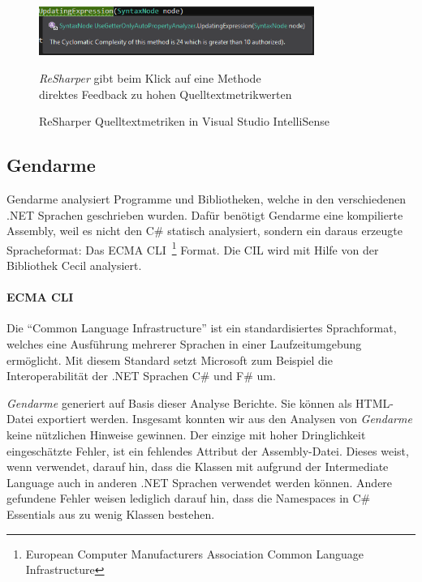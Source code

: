 \begin{figure}[!ht]
	\centering
	\includegraphics[width=0.8\textwidth]{images/rsharper-code-metric-inline.png}
	\caption{ReSharper Quelltextmetriken in Visual Studio IntelliSense}
	\vspace{0.1cm}
	\emph{ReSharper} gibt beim Klick auf eine Methode \\
	direktes Feedback zu hohen Quelltextmetrikwerten 
	\label{fig:rsharper-code-metric-inline}
\end{figure}

\subsection{Gendarme}
\label{sec:gendarme}
Gendarme analysiert Programme und Bibliotheken, welche in den verschiedenen .NET Sprachen geschrieben wurden. Dafür benötigt Gendarme eine kompilierte Assembly, weil es nicht den C\# statisch analysiert, sondern ein daraus erzeugte Spracheformat: Das ECMA CLI~\footnote{European Computer Manufacturers Association Common Language Infrastructure} Format. Die CIL wird mit Hilfe von der Bibliothek Cecil analysiert.~\cite{cecil}
 
\paragraph{ECMA CLI} Die \enquote{Common Language Infrastructure} ist ein standardisiertes Sprachformat, welches eine Ausführung mehrerer Sprachen in einer Laufzeitumgebung ermöglicht. Mit diesem Standard setzt Microsoft zum Beispiel die Interoperabilität der .NET Sprachen C\# und F\# um. ~\cite{ecma}

\vspace{0.2cm}

\emph{Gendarme} generiert auf Basis dieser Analyse Berichte. Sie können als HTML-Datei exportiert werden. Insgesamt konnten wir aus den Analysen von \emph{Gendarme} keine nützlichen Hinweise gewinnen. Der einzige mit hoher Dringlichkeit eingeschätzte Fehler, ist ein fehlendes Attribut der Assembly-Datei. Dieses weist, wenn verwendet, darauf hin, dass die Klassen mit aufgrund der Intermediate Language auch in anderen .NET Sprachen verwendet werden können. Andere gefundene Fehler weisen lediglich darauf hin, dass die Namespaces in C\# Essentials aus zu wenig Klassen bestehen. 

